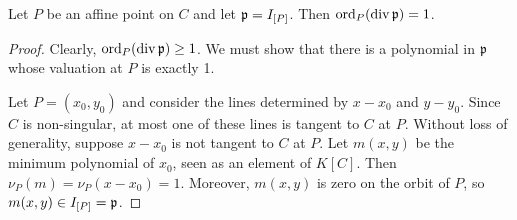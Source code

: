 \begin{lemma}
  \label{lem_order_is_1}
  Let $P$ be an affine point on $C$ and let $\frak p = I_{[P]}$.
  Then $\operatorname{ord}_P(\operatorname{div} \frak p) = 1$.
\end{lemma}
\begin{proof}
  Clearly, $\operatorname{ord}_P(\operatorname{div} \frak p) \geq 1$.
  We must show that there is a polynomial in $\frak p$ whose valuation at $P$ is exactly 1.
  
  Let $P = (x_0, y_0)$ and consider the lines determined by $x - x_0$ and $y - y_0$.
  Since $C$ is non-singular, at most one of these lines is tangent to $C$ at $P$.
  Without loss of generality, suppose $x - x_0$ is not tangent to $C$ at $P$.
  Let $m(x, y)$ be the minimum polynomial of $x_0$, seen as an element of $K[C]$.
  Then $\nu_P(m) = \nu_P(x - x_0) = 1$.
  Moreover, $m(x, y)$ is zero on the orbit of $P$,
  so $m(x, y) \in I_{[P]} = \frak p$.
\end{proof}

